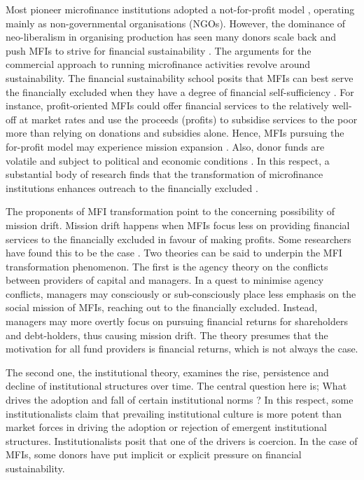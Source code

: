\documentclass[a4paper,nobind]{templates/ociamthesis}
\begin{document}
Most pioneer microfinance institutions adopted a not-for-profit model \autocite{dichter1996questioning}, operating mainly as non-governmental organisations (NGOs). However, the dominance of neo-liberalism in organising production has seen many donors scale back and push MFIs to strive for financial sustainability \autocite{bateman2010doesn}. The arguments for the commercial approach to running microfinance activities revolve around sustainability. The financial sustainability school posits that MFIs can best serve the financially excluded when they have a degree of financial self-sufficiency \autocite{kodongo2013individual}. For instance, profit-oriented MFIs could offer financial services to the relatively well-off at market rates and use the proceeds (profits) to subsidise services to the poor more than relying on donations and subsidies alone. Hence, MFIs pursuing the for-profit model may experience mission expansion \autocite{mersland2010microfinance,louis2013financial}. Also, donor funds are volatile and subject to political and economic conditions \autocite{garmaise2013cheap,d2017aid}. In this respect, a substantial body of research finds that the transformation of microfinance institutions enhances outreach to the financially excluded \autocite{frank2008stemming,gutierrez2009social,mersland2010microfinance,quayes2012depth,mia2017mission,d2013unsubsidized}.

The proponents of MFI transformation point to the concerning possibility of mission drift. Mission drift happens when MFIs focus less on providing financial services to the financially excluded in favour of making profits. Some researchers have found this to be the case \autocite{louis2013financial,bos2015practice,d2013unsubsidized,hartarska2012governance}. Two theories can be said to underpin the MFI transformation phenomenon. The first is the agency theory on the conflicts between providers of capital and managers. In a quest to minimise agency conflicts, managers may consciously or sub-consciously place less emphasis on the social mission of MFIs, reaching out to the financially excluded. Instead, managers may more overtly focus on pursuing financial returns for shareholders and debt-holders, thus causing mission drift. The theory presumes that the motivation for all fund providers is financial returns, which is not always the case.

The second one, the institutional theory, examines the rise, persistence and decline of institutional structures over time. The central question here is; What drives the adoption and fall of certain institutional norms \autocite{powell2012new}? In this respect, some institutionalists claim that prevailing institutional culture is more potent than market forces in driving the adoption or rejection of emergent institutional structures. Institutionalists posit that one of the drivers is coercion. In the case of MFIs, some donors have put implicit or explicit pressure on financial sustainability.
\end{document}
